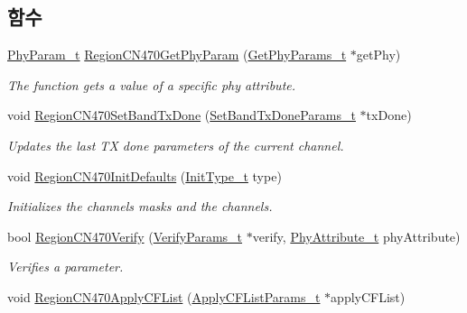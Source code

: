 \subsection*{함수}
\begin{DoxyCompactItemize}
\item 
\mbox{\hyperlink{group___r_e_g_i_o_n_gaed159b26e5c4677236b6e8677019db30}{Phy\+Param\+\_\+t}} \mbox{\hyperlink{group___r_e_g_i_o_n_c_n470_gaa3f4e59184226b161b9e6880b6e7f204}{Region\+C\+N470\+Get\+Phy\+Param}} (\mbox{\hyperlink{group___r_e_g_i_o_n_gab471483fff904f4f89bbc03f7fc380ab}{Get\+Phy\+Params\+\_\+t}} $\ast$get\+Phy)
\begin{DoxyCompactList}\small\item\em The function gets a value of a specific phy attribute. \end{DoxyCompactList}\item 
void \mbox{\hyperlink{group___r_e_g_i_o_n_c_n470_gad60aebff1bb6c89423fff84d57b21cb6}{Region\+C\+N470\+Set\+Band\+Tx\+Done}} (\mbox{\hyperlink{group___r_e_g_i_o_n_gad0524aa0673c0814a71e7a4f9cade3fc}{Set\+Band\+Tx\+Done\+Params\+\_\+t}} $\ast$tx\+Done)
\begin{DoxyCompactList}\small\item\em Updates the last TX done parameters of the current channel. \end{DoxyCompactList}\item 
void \mbox{\hyperlink{group___r_e_g_i_o_n_c_n470_ga6591ac8edd635c34b47ec2f21627b145}{Region\+C\+N470\+Init\+Defaults}} (\mbox{\hyperlink{group___r_e_g_i_o_n_gaddc73ae10673ec925724e7870363bda9}{Init\+Type\+\_\+t}} type)
\begin{DoxyCompactList}\small\item\em Initializes the channels masks and the channels. \end{DoxyCompactList}\item 
bool \mbox{\hyperlink{group___r_e_g_i_o_n_c_n470_ga7d7ddf394ddb8a6ac2d7cb5fea7ad745}{Region\+C\+N470\+Verify}} (\mbox{\hyperlink{group___r_e_g_i_o_n_ga966d97bc2f25df1c09e92e60ef652276}{Verify\+Params\+\_\+t}} $\ast$verify, \mbox{\hyperlink{group___r_e_g_i_o_n_ga9445b07fdf77581ecfaf389970e635f8}{Phy\+Attribute\+\_\+t}} phy\+Attribute)
\begin{DoxyCompactList}\small\item\em Verifies a parameter. \end{DoxyCompactList}\item 
void \mbox{\hyperlink{group___r_e_g_i_o_n_c_n470_gae0ca4a5d6bf63fdb278a132ec496649f}{Region\+C\+N470\+Apply\+C\+F\+List}} (\mbox{\hyperlink{group___r_e_g_i_o_n_ga71588e9ad07e34b78fa91d51881fd3c6}{Apply\+C\+F\+List\+Params\+\_\+t}} $\ast$apply\+C\+F\+List)

\end{DoxyCompactItemize}
